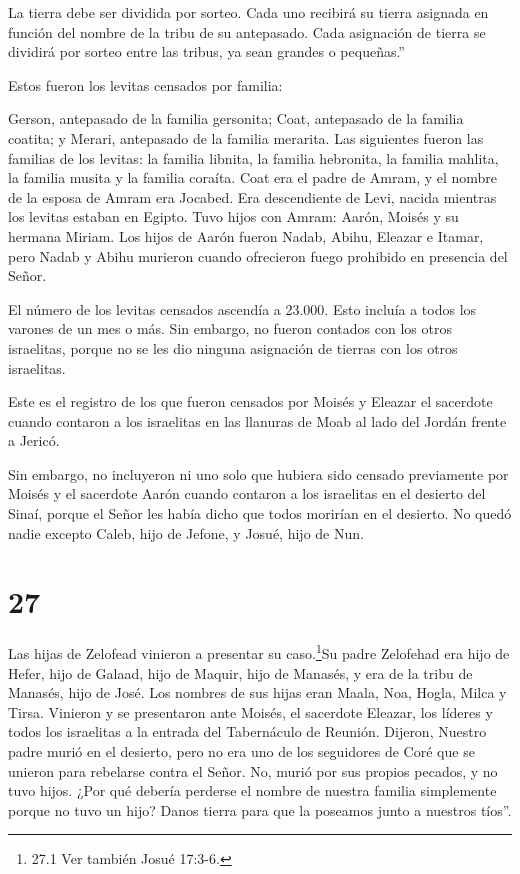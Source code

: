  La tierra debe ser dividida por sorteo. Cada uno recibirá
su tierra asignada en función del nombre de la tribu de su antepasado.
 Cada asignación de tierra se dividirá por sorteo entre las
tribus, ya sean grandes o pequeñas.''

 Estos fueron los levitas censados por familia:

Gerson, antepasado de la familia gersonita; Coat, antepasado de la
familia coatita; y Merari, antepasado de la familia merarita.
 Las siguientes fueron las familias de los levitas: la
familia libnita, la familia hebronita, la familia mahlita, la familia
musita y la familia coraíta. Coat era el padre de Amram,  y
el nombre de la esposa de Amram era Jocabed. Era descendiente de Levi,
nacida mientras los levitas estaban en Egipto. Tuvo hijos con Amram:
Aarón, Moisés y su hermana Miriam.  Los hijos de Aarón
fueron Nadab, Abihu, Eleazar e Itamar,  pero Nadab y Abihu
murieron cuando ofrecieron fuego prohibido en presencia del Señor.

 El número de los levitas censados ascendía a 23.000. Esto
incluía a todos los varones de un mes o más. Sin embargo, no fueron
contados con los otros israelitas, porque no se les dio ninguna
asignación de tierras con los otros israelitas.

 Este es el registro de los que fueron censados por Moisés
y Eleazar el sacerdote cuando contaron a los israelitas en las llanuras
de Moab al lado del Jordán frente a Jericó.

 Sin embargo, no incluyeron ni uno solo que hubiera sido
censado previamente por Moisés y el sacerdote Aarón cuando contaron a
los israelitas en el desierto del Sinaí,  porque el Señor
les había dicho que todos morirían en el desierto. No quedó nadie
excepto Caleb, hijo de Jefone, y Josué, hijo de Nun.

\hypertarget{section-26}{%
\section{27}\label{section-26}}

 Las hijas de Zelofead vinieron a presentar su
caso.\footnote{27.1 Ver también Josué 17:3-6.}Su padre Zelofehad era
hijo de Hefer, hijo de Galaad, hijo de Maquir, hijo de Manasés, y era de
la tribu de Manasés, hijo de José. Los nombres de sus hijas eran Maala,
Noa, Hogla, Milca y Tirsa. Vinieron  y se presentaron ante
Moisés, el sacerdote Eleazar, los líderes y todos los israelitas a la
entrada del Tabernáculo de Reunión. Dijeron,  Nuestro padre
murió en el desierto, pero no era uno de los seguidores de Coré que se
unieron para rebelarse contra el Señor. No, murió por sus propios
pecados, y no tuvo hijos.  ¿Por qué debería perderse el
nombre de nuestra familia simplemente porque no tuvo un hijo? Danos
tierra para que la poseamos junto a nuestros tíos''.

